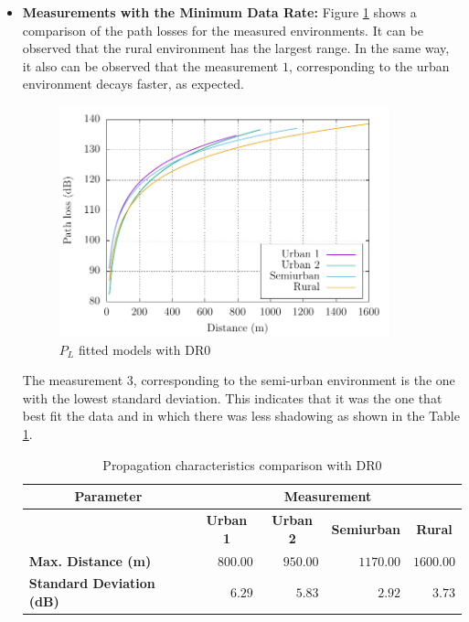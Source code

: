 \begin{itemize}

\item \textbf{Measurements with the Minimum Data Rate:} Figure \ref{fig:allfitteddr0} shows a comparison of the path losses for the measured environments. It can be observed that the rural environment has the largest range. In the same way, it also can be observed that the measurement $1$, corresponding to the urban environment decays faster, as expected.

\begin{figure}[h!]
  \centering
  \includegraphics[width=0.9\textwidth]{./figures/Figure8/Figure8.pdf}
  \caption{$P_L$ fitted models with DR$0$}
  \label{fig:allfitteddr0}
\end{figure}

The measurement $3$, corresponding to the semi-urban environment is the one with the lowest standard deviation. This indicates that it was the one that best fit the data and in which there was less shadowing as shown in the Table \ref{tab:propagationcomparisondr0}.

\begin{table}[h!]
\centering
\caption{Propagation characteristics comparison with DR$0$}
\label{tab:propagationcomparisondr0}
\begin{tabular}{@{}lrrrr@{}}
\toprule
\multicolumn{1}{c}{\textbf{Parameter}} & \multicolumn{4}{c}{\textbf{Measurement}}                                                                                          \\ \midrule
\textbf{}                              & \multicolumn{1}{c}{\textbf{Urban 1}} & \multicolumn{1}{c}{\textbf{Urban 2}} & \multicolumn{1}{c}{\textbf{Semiurban}} & \multicolumn{1}{c}{\textbf{Rural}} \\
\textbf{Max. Distance (m)}             & $800.00$                            & $950.00$                            & $1170.00$                           & $1600.00$                           \\
\textbf{Standard Deviation (dB)}       & $6.29$                           & $5.83$                           & $2.92$                           & $3.73$                           \\ \bottomrule
\end{tabular}
\end{table}



\end{itemize}
